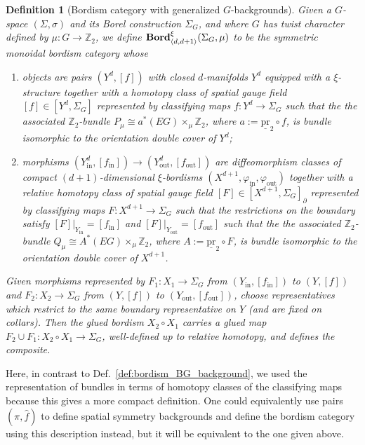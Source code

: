\documentclass[aps,prx,reprint,superscriptaddress,twocolumn,amsmath,amssymb,amsfonts, nofootinbib]{revtex4-2}
\newcommand{\bordd}{{\bf Bord}_{\langle d, d+1\rangle}}
\newcommand{\Z}{\mathbb{Z}}
\theoremstyle{apsstyle}
\newtheorem{definition}[theorem]{Definition}
\begin{document}
\begin{definition}[Bordism category with generalized $G$-backgrounds]
\label{def:bordism_spatial_BG_background}
Given a $G$-space $(\Sigma, \sigma)$ and its Borel construction $\Sigma_{G}$, and where $G$ has twist character defined by $\mu: G \to\Z_{2}$, we define $\bordd^{\xi}(\Sigma_{G},\mu )$ to be the symmetric monoidal bordism category whose
\begin{enumerate}[label=\roman*,leftmargin=1.7em]
\item objects are pairs $(Y^{d}, [f])$ with closed $d$-manifolds $Y^{d}$ equipped with a $\xi$-structure together with a homotopy class of spatial gauge field $[f]\in [Y^{d}, \Sigma_{G}]$ represented by classifying maps $f:Y^{d}\to \Sigma_{G}$ such that the the associated $\Z_{2}$-bundle $P_{\mu}\cong a^{*}(EG)\times_{\mu} \Z_{2}$, where $a:=\underline{\mathrm{pr}}_{2}\circ f$, is bundle isomorphic to the orientation double cover of $Y^{d}$;
\item morphisms $(Y^{d}_{\mathrm{in}},[f_{\mathrm{in}}])\to (Y^{d}_{\mathrm{out}},[f_{\mathrm{out}}])$ are diffeomorphism classes of compact $(d{+}1)$-dimensional $\xi$-bordisms $(X^{d+1}, \varphi_{\mathrm{in}}, \varphi_{\mathrm{out}})$ together with a \textit{relative} homotopy class of spatial gauge field $[F]\in [X^{d+1}, \Sigma_{G}]_{\partial}$ represented by classifying maps $F:X^{d+1}\to \Sigma_{G}$ such that the restrictions on the boundary satisfy $[F]\vert_{Y_{\mathrm{in}}} = [f_{\mathrm{in}}]$ and $[F]\vert_{Y_{\mathrm{out}}} = [f_{\mathrm{out}}]$ such that the the associated $\Z_{2}$-bundle $Q_{\mu}\cong A^{*}(EG)\times_{\mu} \Z_{2}$, where $A:=\underline{\mathrm{pr}}_{2}\circ F$, is bundle isomorphic to the orientation double cover of $X^{d+1}$.
\end{enumerate}
Given morphisms represented by $F_1:X_1\to\Sigma_G$ from $(Y_{\mathrm{in}},[f_{\mathrm{in}}])$ to $(Y,[f])$ and $F_2:X_2\to\Sigma_G$ from $(Y,[f])$ to $(Y_{\mathrm{out}},[f_{\mathrm{out}}])$, choose representatives which restrict to the same boundary representative on $Y$ (and are fixed on collars). Then the glued bordism $X_2\circ X_1$ carries a glued map $F_2\cup F_1:X_2\circ X_1\to\Sigma_G$, well-defined up to relative homotopy, and defines the composite.
\end{definition}


\bigskip

\noindent Here, in contrast to Def.~\ref{def:bordism_BG_background}, we used the representation of bundles in terms of homotopy classes of the classifying maps because this gives a more compact definition. One could equivalently use pairs $(\pi, \hat{f})$ to define spatial symmetry backgrounds and define the bordism category using this description instead, but it will be equivalent to the one given above. 
\end{document}

